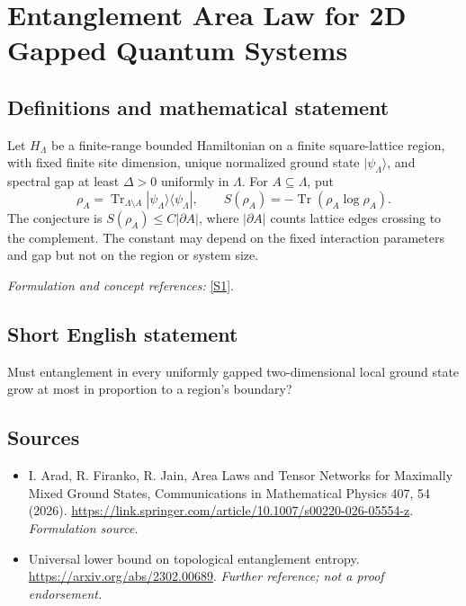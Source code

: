 \documentclass[11pt]{article}
\begin{document}
\section*{\texorpdfstring{Entanglement Area Law for 2D Gapped Quantum Systems}{Entanglement Area Law for 2D Gapped Quantum Systems}}\label{30006724}
\subsection{Definitions and mathematical statement}
Let $H_\Lambda$ be a finite-range bounded Hamiltonian on a finite square-lattice region, with fixed finite site dimension, unique normalized ground state $|\psi_\Lambda\rangle$, and spectral gap at least $\Delta>0$ uniformly in $\Lambda$. For $A\subseteq\Lambda$, put
\[
 \rho_A=\operatorname{Tr}_{\Lambda\setminus A}|\psi_\Lambda\rangle\langle\psi_\Lambda|,
 \qquad S(\rho_A)=-\operatorname{Tr}(\rho_A\log\rho_A).
\]
The conjecture is $S(\rho_A)\le C|\partial A|$, where $|\partial A|$ counts lattice edges crossing to the complement. The constant may depend on the fixed interaction parameters and gap but not on the region or system size.
\par\smallskip\textit{Formulation and concept references:} \href{https://link.springer.com/article/10.1007/s00220-026-05554-z}{[S1]}.

\subsection{Short English statement}
Must entanglement in every uniformly gapped two-dimensional local ground state grow at most in proportion to a region's boundary?
\subsection{Sources}
\begin{itemize}
\item[S1]I. Arad, R. Firanko, R. Jain, Area Laws and Tensor Networks for Maximally Mixed Ground States, Communications in Mathematical Physics 407, 54 (2026).
\url{https://link.springer.com/article/10.1007/s00220-026-05554-z}.
\textit{Formulation source.}
\item[S2]Universal lower bound on topological entanglement entropy.
\url{https://arxiv.org/abs/2302.00689}.
\textit{Further reference; not a proof endorsement.}
\end{itemize}
\end{document}

